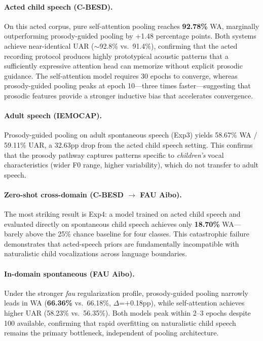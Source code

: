 \paragraph{Acted child speech (C-BESD).}
On this acted corpus, pure self-attention pooling reaches \textbf{92.78\%} WA, marginally outperforming prosody-guided pooling by +1.48 percentage points.
Both systems achieve near-identical UAR ($\sim$92.8\% vs.\ 91.4\%), confirming that the acted recording protocol produces highly prototypical acoustic patterns that a sufficiently expressive attention head can memorize without explicit prosodic guidance.
The self-attention model requires 30 epochs to converge, whereas prosody-guided pooling peaks at epoch 10---three times faster---suggesting that prosodic features provide a stronger inductive bias that accelerates convergence.

\paragraph{Adult speech (IEMOCAP).}
Prosody-guided pooling on adult spontaneous speech (Exp3) yields 58.67\% WA / 59.11\% UAR, a 32.63pp drop from the acted child speech setting.
This confirms that the prosody pathway captures patterns specific to \textit{children's} vocal characteristics (wider F0 range, higher variability), which do not transfer to adult speech.

\paragraph{Zero-shot cross-domain (C-BESD $\rightarrow$ FAU Aibo).}
The most striking result is Exp4: a model trained on acted child speech and evaluated directly on spontaneous child speech achieves only \textbf{18.70\%} WA---barely above the 25\% chance baseline for four classes.
This catastrophic failure demonstrates that acted-speech priors are fundamentally incompatible with naturalistic child vocalizations across language boundaries.

\paragraph{In-domain spontaneous (FAU Aibo).}
Under the stronger \textit{fau} regularization profile, prosody-guided pooling narrowly leads in WA (\textbf{66.36\%} vs.\ 66.18\%, $\Delta$=+0.18pp), while self-attention achieves higher UAR (58.23\% vs.\ 56.35\%).
Both models peak within 2--3 epochs despite 100 available, confirming that rapid overfitting on naturalistic child speech remains the primary bottleneck, independent of pooling architecture.


